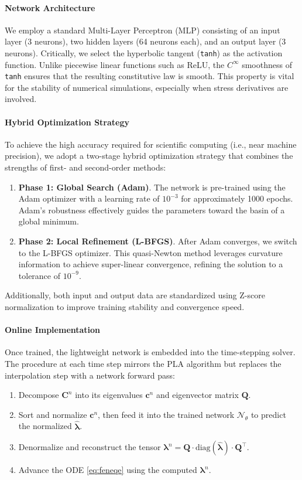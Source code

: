 \documentclass[preprint,12pt]{elsarticle}
\begin{document}
\paragraph{Network Architecture}
We employ a standard Multi-Layer Perceptron (MLP) consisting of an input layer (3 neurons), two hidden layers (64 neurons each), and an output layer (3 neurons). Critically, we select the hyperbolic tangent (\texttt{tanh}) as the activation function. Unlike piecewise linear functions such as ReLU, the $C^{\infty}$ smoothness of \texttt{tanh} ensures that the resulting constitutive law is smooth. This property is vital for the stability of numerical simulations, especially when stress derivatives are involved.

\paragraph{Hybrid Optimization Strategy}
To achieve the high accuracy required for scientific computing (i.e., near machine precision), we adopt a two-stage hybrid optimization strategy that combines the strengths of first- and second-order methods:
\begin{enumerate}
    \item \textbf{Phase 1: Global Search (Adam)}. The network is pre-trained using the Adam optimizer with a learning rate of $10^{-3}$ for approximately 1000 epochs. Adam's robustness effectively guides the parameters toward the basin of a global minimum.
    \item \textbf{Phase 2: Local Refinement (L-BFGS)}. After Adam converges, we switch to the L-BFGS optimizer. This quasi-Newton method leverages curvature information to achieve super-linear convergence, refining the solution to a tolerance of $10^{-9}$.
\end{enumerate}
Additionally, both input and output data are standardized using Z-score normalization to improve training stability and convergence speed.

\paragraph{Online Implementation}
Once trained, the lightweight network is embedded into the time-stepping solver. The procedure at each time step mirrors the PLA algorithm but replaces the interpolation step with a network forward pass:
\begin{enumerate}
    \item Decompose $\bm{C}^n$ into its eigenvalues $\bm{c}^n$ and eigenvector matrix $\bm{Q}$.
    \item Sort and normalize $\bm{c}^n$, then feed it into the trained network $\mathcal{N}_{\theta}$ to predict the normalized $\hat{\bm{\lambda}}$.
    \item Denormalize and reconstruct the tensor $\bm{\lambda}^n = \bm{Q} \cdot \mathrm{diag}(\hat{\bm{\lambda}}) \cdot \bm{Q}^\top$.
    \item Advance the ODE \eqref{eq:feneqe} using the computed $\bm{\lambda}^n$.
\end{enumerate}
\end{document}
